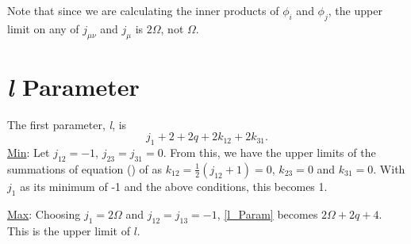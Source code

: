 \documentclass[Dissertation.tex]{subfiles}
\begin{document}
Note that since we are calculating the inner products of $\phi_i$ and $\phi_j$, the upper limit on any of $j_{\mu \nu}$ and $j_{\mu}$ is $2\Omega$, not $\Omega$.

\section{\emph{l} Parameter}
The first parameter, \emph{l}, is
\begin{equation}
	\label{l_Param}j_1 + 2 + 2q + 2 k_{12} + 2 k_{31}.
\end{equation}
\underline{Min}: Let $j_{12} = -1$, $j_{23} = j_{31} = 0$.  From this, we have the upper limits of the summations of equation () of \cite{Drake1995} as $k_{12} = \tfrac{1}{2} (j_{12} + 1) = 0$, $k_{23} = 0$ and $k_{31} = 0$.  With $j_1$ as its minimum of -1 and the above conditions, this becomes 1.

\noindent\underline{Max}: Choosing $j_1 = 2 \Omega$ and $j_{12} = j_{13} = -1$, \cref{l_Param} becomes $2 \Omega + 2q + 4$.  This is the upper limit of $l$.
\end{document}
